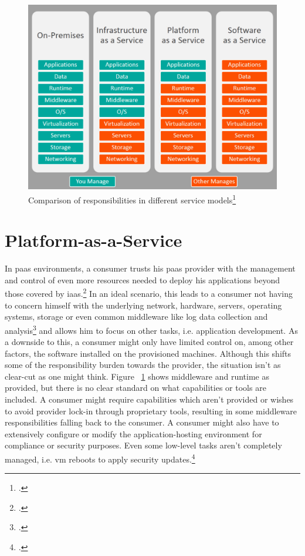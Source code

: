 \begin{figure}[H]
\includegraphics[scale=0.4]{pictures/ServiceComparison.jpg} 
\caption{Comparison of responsibilities in different service models\protect\footcite{servicecomparison}}
\label{fig:servicecomparison}
\end{figure}

\section{Platform-as-a-Service}

In \gls{paas} environments, a consumer trusts his \gls{paas} provider with the management and control of even more resources needed to deploy his applications beyond those covered by \gls{iaas}.\footcite{nistcloud}
In an ideal scenario, this leads to a consumer not having to concern himself with the underlying network, hardware, servers, operating systems, storage or even common middleware like log data collection and analysis\footcite{msPaas} and allows him to focus on other tasks, i.e. application development.
As a downside to this, a consumer might only have limited control on, among other factors, the software installed on the provisioned machines. 
Although this shifts some of the responsibility burden towards the provider, the situation isn't as clear-cut as one might think. 
Figure ~\ref{fig:servicecomparison} shows middleware and runtime as provided, but there is no clear standard on what capabilities or tools are included.
A consumer might require capabilities which aren't provided or wishes to avoid provider lock-in through proprietary tools, 
resulting in some middleware responsibilities falling back to the consumer. 
A consumer might also have to extensively configure or modify the application-hosting environment for compliance or security purposes. 
Even some low-level tasks aren't completely managed, i.e. \gls{vm} reboots to apply security updates.\footcite{msVmReboot}


